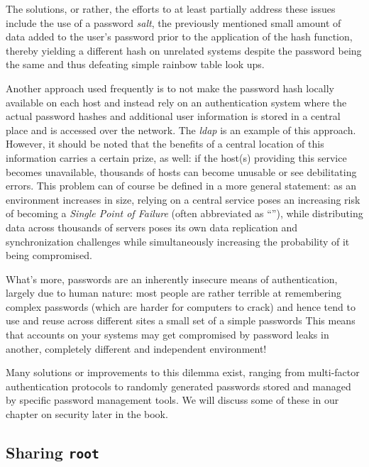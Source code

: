 The solutions, or rather, the efforts to at least
partially address these issues include the use of a
password {\em salt}, the previously
mentioned small amount of data added to the user's
password prior to the application of the hash
function, thereby yielding a different hash on
unrelated systems despite the password being the same
and thus defeating simple rainbow table look ups.

Another approach used frequently is to not make the
password hash locally available on each host and
instead rely on an authentication system where the
actual password hashes and additional user
information is stored in a central place and is
accessed over the network.  The {\em
\gls{ldap}} is an example of this
approach.  However, it should be noted that the
benefits of a central location of this information
carries a certain prize, as well: if the host(s)
providing this service becomes unavailable, thousands
of hosts can become unusable or see debilitating
errors.  This problem can of course be defined in a
more general statement: as an environment increases in
size, relying on a central service poses an increasing
risk of becoming a {\em Single Point of
Failure} (often
abbreviated as ``''), while
distributing data across thousands of servers poses
its own data replication and synchronization
challenges while simultaneously increasing the
probability of it being compromised.

What's more, passwords are an inherently insecure
means of authentication, largely due to human nature:
most people are rather terrible at remembering complex
passwords (which are harder for computers to crack)
and hence tend to use and reuse across different sites
a small set of a simple passwords This means that
accounts on your systems may get compromised by
password leaks in another, completely different and
independent environment!

Many solutions or improvements to this dilemma exist,
ranging from multi-factor authentication protocols to
randomly generated passwords stored and managed by
specific password management tools.  We will discuss
some of these in our chapter on security later in the
book.

\subsection{Sharing {\tt root}}
\label{multi-user:authentication:shared-root}

